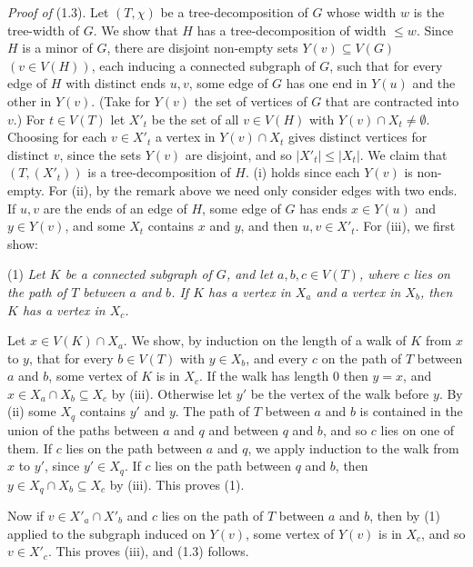 {\textit{Proof of} (1.3). Let $(T, \chi)$ be a tree-decomposition of $G$ whose width $w$ is the
tree-width of $G$. We show that $H$ has a tree-decomposition of width $\le w$. Since $H$ is a minor of $G$, there are disjoint non-empty
sets $Y(v) \subseteq V(G)$ $(v \in V(H))$, each inducing a connected subgraph of $G$, such that for
every edge of $H$ with distinct ends $u, v$, some edge of $G$ has one end in $Y(u)$ and the other in
$Y(v)$. (Take for $Y(v)$ the set of vertices of $G$ that are contracted into $v$.) For
$t \in V(T)$ let $X'_t$ be the set of all $v \in V(H)$ with $Y(v) \cap X_t \ne \emptyset$. Choosing
for each $v \in X'_t$ a vertex in $Y(v) \cap X_t$ gives distinct vertices for distinct $v$, since
the sets $Y(v)$ are disjoint, and so $|X'_t| \le |X_t|$. We claim that $(T, (X'_t))$ is a
tree-decomposition of $H$. (i) holds since each $Y(v)$ is non-empty. For (ii), by the remark above we need
only consider edges with two ends. If $u, v$ are the ends of an edge of $H$, some edge of $G$ has ends $x \in Y(u)$ and $y \in Y(v)$, and some $X_t$
contains $x$ and $y$, and then $u, v \in X'_t$. For (iii), we first show:

\hspace*{12pt}(1) \textit{Let $K$ be a connected subgraph of $G$, and let $a, b, c \in V(T)$, where
$c$ lies on the path of $T$ between $a$ and $b$. If $K$ has a vertex in $X_a$ and a vertex in
$X_b$, then $K$ has a vertex in $X_c$.}

Let $x \in V(K) \cap X_a$. We show, by induction on the length of a walk of $K$ from $x$ to $y$,
that for every $b \in V(T)$ with $y \in X_b$, and every $c$ on the path of $T$ between $a$ and $b$,
some vertex of $K$ is in $X_c$. If the walk has length 0 then $y = x$, and
$x \in X_a \cap X_b \subseteq X_c$ by (iii). Otherwise let $y'$ be the vertex of the walk before
$y$. By (ii) some $X_q$ contains $y'$ and $y$. The path of $T$ between $a$ and $b$ is contained in
the union of the paths between $a$ and $q$ and between $q$ and $b$, and so $c$ lies on one of them.
If $c$ lies on the path between $a$ and $q$, we apply induction to the walk from $x$ to $y'$, since
$y' \in X_q$. If $c$ lies on the path between $q$ and $b$, then $y \in X_q \cap X_b \subseteq X_c$
by (iii). This proves (1).

Now if $v \in X'_a \cap X'_b$ and $c$ lies on the path of $T$ between $a$ and $b$, then by (1)
applied to the subgraph induced on $Y(v)$, some vertex of $Y(v)$ is in $X_c$, and so $v \in X'_c$.
This proves (iii), and (1.3) follows.

}
